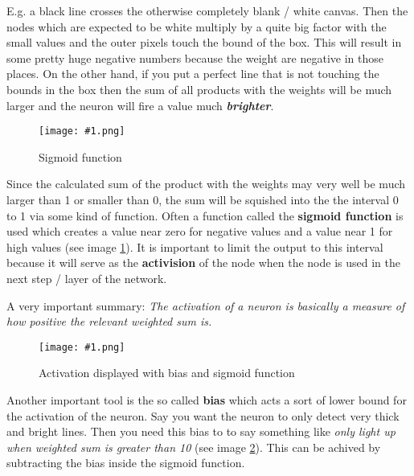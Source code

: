 \documentclass{article}
\newcommand{\lbl}[1]{(see image \ref{#1})}
\newcommand{\img}[1]{
	\centering
	\texttt{[image: \#1.png]}
	\label{#1}
}
\begin{document}
E.g. a black line crosses the otherwise completely blank / white canvas. Then the nodes which are expected to be white multiply by a quite big factor with the small values and the outer pixels touch the bound of the box. This will result in some pretty huge negative numbers because the weight are negative in those places. On the other hand, if you put a perfect line that is not touching the bounds in the box then the sum of all products with the weights will be much larger and the neuron will fire a value much \textit{\textbf{brighter}}.

\begin{figure}[h]
\img{ai_9}
\caption{Sigmoid function}
\end{figure}

Since the calculated sum of the product with the weights may very well be much larger than 1 or smaller than 0, the sum will be squished into the the interval 0 to 1 via some kind of function. Often a function called the \textbf{sigmoid function} is used which creates a value near zero for negative values and a value near 1 for high values \lbl{ai_9}. It is important to limit the output to this interval because it will serve as the \textbf{activision} of the node when the node is used in the next step / layer of the network. 

A very important summary: \textit{The activation of a neuron is basically a measure of how positive the relevant weighted sum is.}


\begin{figure}[h]
\img{ai_10}
\caption{Activation displayed with bias and sigmoid function}
\end{figure}

Another important tool is the so called \textbf{bias} which acts a sort of lower bound for the activation of the neuron. Say you want the neuron to only detect very thick and bright lines. Then you need this bias to to say something like \textit{only light up when weighted sum is greater than 10} \lbl{ai_10}. This can be achived by subtracting the bias inside the sigmoid function.
\end{document}
